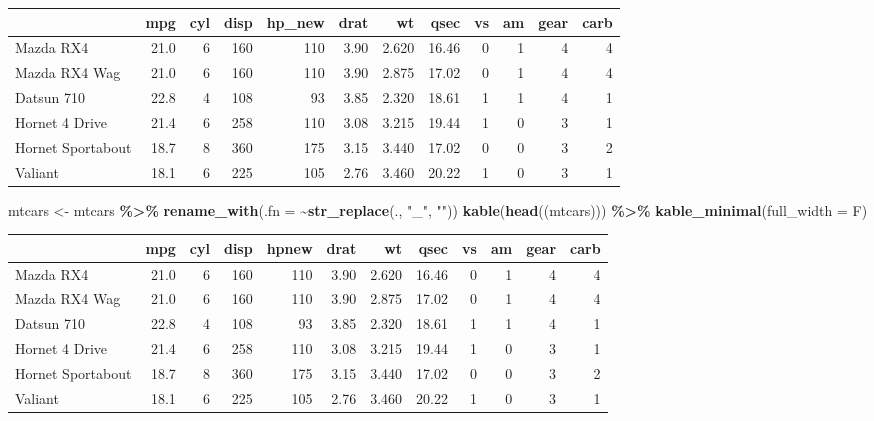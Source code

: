 \documentclass[
]{article}
\newenvironment{Shaded}{\begin{snugshade}}{\end{snugshade}}
\newcommand{\AttributeTok}[1]{\textcolor[rgb]{0.13,0.29,0.53}{#1}}
\newcommand{\FunctionTok}[1]{\textcolor[rgb]{0.13,0.29,0.53}{\textbf{#1}}}
\newcommand{\NormalTok}[1]{#1}
\newcommand{\OtherTok}[1]{\textcolor[rgb]{0.56,0.35,0.01}{#1}}
\newcommand{\SpecialCharTok}[1]{\textcolor[rgb]{0.81,0.36,0.00}{\textbf{#1}}}
\newcommand{\StringTok}[1]{\textcolor[rgb]{0.31,0.60,0.02}{#1}}
\begin{document}
\begin{table}
\centering
\begin{tabular}{l|r|r|r|r|r|r|r|r|r|r|r}
\hline
  & mpg & cyl & disp & hp\_new & drat & wt & qsec & vs & am & gear & carb\\
\hline
Mazda RX4 & 21.0 & 6 & 160 & 110 & 3.90 & 2.620 & 16.46 & 0 & 1 & 4 & 4\\
\hline
Mazda RX4 Wag & 21.0 & 6 & 160 & 110 & 3.90 & 2.875 & 17.02 & 0 & 1 & 4 & 4\\
\hline
Datsun 710 & 22.8 & 4 & 108 & 93 & 3.85 & 2.320 & 18.61 & 1 & 1 & 4 & 1\\
\hline
Hornet 4 Drive & 21.4 & 6 & 258 & 110 & 3.08 & 3.215 & 19.44 & 1 & 0 & 3 & 1\\
\hline
Hornet Sportabout & 18.7 & 8 & 360 & 175 & 3.15 & 3.440 & 17.02 & 0 & 0 & 3 & 2\\
\hline
Valiant & 18.1 & 6 & 225 & 105 & 2.76 & 3.460 & 20.22 & 1 & 0 & 3 & 1\\
\hline
\end{tabular}
\end{table}

\begin{Shaded}
\begin{Highlighting}[]
\NormalTok{mtcars }\OtherTok{\textless{}{-}}\NormalTok{ mtcars }\SpecialCharTok{\%\textgreater{}\%} \FunctionTok{rename\_with}\NormalTok{(}\AttributeTok{.fn =} \SpecialCharTok{\textasciitilde{}}\FunctionTok{str\_replace}\NormalTok{(., }\StringTok{"\_"}\NormalTok{, }\StringTok{""}\NormalTok{))}
\FunctionTok{kable}\NormalTok{(}\FunctionTok{head}\NormalTok{((mtcars))) }\SpecialCharTok{\%\textgreater{}\%} \FunctionTok{kable\_minimal}\NormalTok{(}\AttributeTok{full\_width =}\NormalTok{ F)}
\end{Highlighting}
\end{Shaded}

\begin{table}
\centering
\begin{tabular}{l|r|r|r|r|r|r|r|r|r|r|r}
\hline
  & mpg & cyl & disp & hpnew & drat & wt & qsec & vs & am & gear & carb\\
\hline
Mazda RX4 & 21.0 & 6 & 160 & 110 & 3.90 & 2.620 & 16.46 & 0 & 1 & 4 & 4\\
\hline
Mazda RX4 Wag & 21.0 & 6 & 160 & 110 & 3.90 & 2.875 & 17.02 & 0 & 1 & 4 & 4\\
\hline
Datsun 710 & 22.8 & 4 & 108 & 93 & 3.85 & 2.320 & 18.61 & 1 & 1 & 4 & 1\\
\hline
Hornet 4 Drive & 21.4 & 6 & 258 & 110 & 3.08 & 3.215 & 19.44 & 1 & 0 & 3 & 1\\
\hline
Hornet Sportabout & 18.7 & 8 & 360 & 175 & 3.15 & 3.440 & 17.02 & 0 & 0 & 3 & 2\\
\hline
Valiant & 18.1 & 6 & 225 & 105 & 2.76 & 3.460 & 20.22 & 1 & 0 & 3 & 1\\
\hline
\end{tabular}
\end{table}
\end{document}
